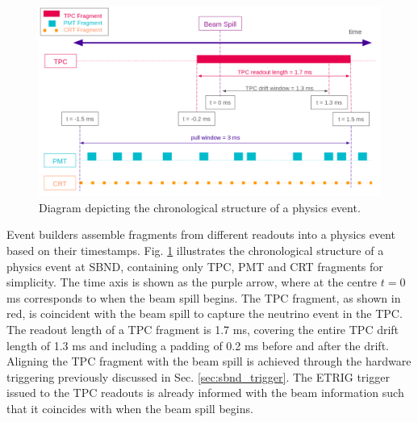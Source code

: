 \begin{figure}[htbp!] 
\centering    
\includegraphics[width=1.0\textwidth]{SBND_Event_Structure}
\caption[Chronological Structure of a Physics Event Diagram]{
Diagram depicting the chronological structure of a physics event. 
}
\label{fig:SBNDEventStructure}
\end{figure}

Event builders assemble fragments from different readouts into a physics event based on their timestamps.
Fig. \ref{fig:SBNDEventStructure} illustrates the chronological structure of a physics event at SBND, containing only TPC, PMT and CRT fragments for simplicity.
The time axis is shown as the purple arrow, where at the centre $t = 0$ ms corresponds to when the beam spill begins.
The TPC fragment, as shown in red, is coincident with the beam spill to capture the neutrino event in the TPC. 
The readout length of a TPC fragment is 1.7 ms, covering the entire TPC drift length of 1.3 ms and including a padding of 0.2 ms before and after the drift. 
Aligning the TPC fragment with the beam spill is achieved through the hardware triggering previously discussed in Sec. \ref{sec:sbnd_trigger}. 
The ETRIG trigger issued to the TPC readouts is already informed with the beam information such that it coincides with when the beam spill begins.



